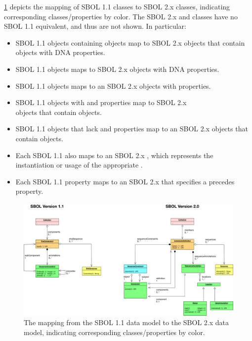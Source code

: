 \ref{SBOL1TO2} depicts the mapping of SBOL 1.1 classes to SBOL 2.x classes, indicating corresponding classes/properties by color.
The SBOL 2.x  and  classes have no SBOL 1.1 equivalent, and thus are not shown.
In particular:
\begin{itemize}
\item SBOL 1.1  objects containing  objects map to SBOL 2.x  objects that contain  objects with DNA  properties.
\item SBOL 1.1  objects maps to SBOL 2.x  objects with DNA  properties.
\item SBOL 1.1  objects maps to an SBOL 2.x  objects with   properties.
\item SBOL 1.1  objects with  and  properties map to SBOL 2.x\\
 objects that contain  objects.
\item SBOL 1.1  objects that lack  and  properties map to an SBOL 2.x  objects that contain  objects.
\item Each SBOL 1.1  also maps to an SBOL 2.x , which represents the instantiation or usage of the appropriate .
\item Each SBOL 1.1  property maps to an SBOL 2.x  that specifies a precedes  property.
\end{itemize}

\begin{figure}[h]
\begin{center}
  \includegraphics[width=\textwidth]{images/sbol_v1_to_v2}
\end{center}
\caption{\label{SBOL1TO2}The mapping from the SBOL 1.1 data model to the SBOL 2.x  data model, indicating corresponding classes/properties by color.}
\end{figure}
